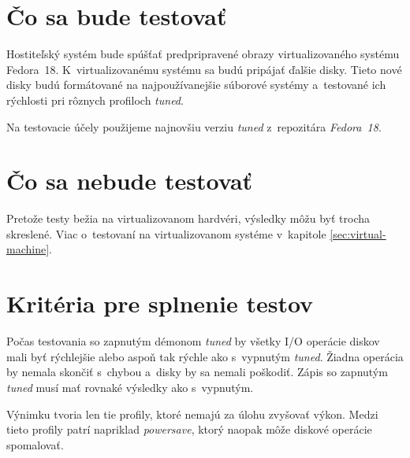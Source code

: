 \section{Čo sa bude testovať}

Hostiteľský systém bude spúšťať predpripravené obrazy virtualizovaného systému
Fedora~18. K~virtualizovanému systému sa budú pripájať ďalšie disky. Tieto nové
disky budú formátované na najpoužívanejšie súborové systémy a~testované ich
rýchlosti pri rôznych profiloch \emph{tuned}.

Na testovacie účely použijeme najnovšiu verziu \emph{tuned} z~repozitára
\emph{Fedora~18}.

\section{Čo sa nebude testovať}

Pretože testy bežia na virtualizovanom hardvéri, výsledky môžu byť trocha
skreslené. Viac o~testovaní na virtualizovanom systéme v~kapitole
\ref{sec:virtual-machine}.


\section{Kritéria pre splnenie testov}

Počas testovania so zapnutým démonom \emph{tuned} by všetky I/O operácie diskov
mali byť rýchlejšie alebo aspoň tak rýchle ako s~vypnutým \emph{tuned}. Žiadna
operácia by nemala skončiť s~chybou a~disky by sa nemali poškodiť. Zápis so
zapnutým \emph{tuned} musí mať rovnaké výsledky ako s~vypnutým.

Výnimku tvoria len tie profily, ktoré nemajú za úlohu zvyšovať výkon. Medzi
tieto profily patrí napriklad \emph{powersave}, ktorý naopak môže diskové
operácie spomalovať.

